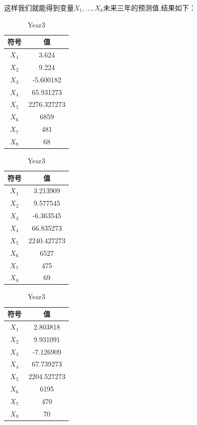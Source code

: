 \documentclass[UTF8, zihao=-4]{ctexart}
\begin{document}
		这样我们就能得到变量$X_1,...,X_8$未来三年的预测值,结果如下：
		\begin{table}[H]
			\begin{minipage}[b]{0.3\textwidth}
				\centering
				\begin{tabular}{@{}c c@{}}
					\toprule
					\textbf{符号} & \textbf{值} \\
					\midrule
					$X_1$        & 3.624 \\
					$X_2$		 & 9.224 \\
					$X_3$		 & -5.600182 \\
					$X_4$		 & 65.931273 \\
					$X_5$		 & 2276.327273 \\
					$X_6$		 & 6859 \\
					$X_7$		 & 481 \\
					$X_8$		 & 68 \\
					\bottomrule
				\end{tabular}
				\caption{Year1}
			\end{minipage}
			\begin{minipage}[b]{0.3\textwidth}
				\centering
				\begin{tabular}{@{}c c@{}}
					\toprule
					\textbf{符号} & \textbf{值} \\
					\midrule
					$X_1$        & 3.213909 \\
					$X_2$		 & 9.577545 \\
					$X_3$		 & -6.363545 \\
					$X_4$		 & 66.835273 \\
					$X_5$		 & 2240.427273 \\
					$X_6$		 & 6527 \\
					$X_7$		 & 475 \\
					$X_8$		 & 69 \\
					\bottomrule
				\end{tabular}
				\caption{Year2}
			\end{minipage}
			\begin{minipage}[b]{0.3\textwidth}
				\centering
				\begin{tabular}{@{}c c@{}}
					\toprule
					\textbf{符号} & \textbf{值} \\
					\midrule
					$X_1$        & 2.803818 \\
					$X_2$		 & 9.931091 \\
					$X_3$		 & -7.126909 \\
					$X_4$		 & 67.739273 \\
					$X_5$		 & 2204.527273 \\
					$X_6$		 & 6195 \\
					$X_7$		 & 470 \\
					$X_8$		 & 70 \\
					\bottomrule
				\end{tabular}
				\caption{Year3}
			\end{minipage}
		\end{table}
\end{document}
